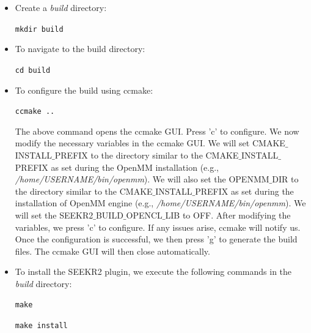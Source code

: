 \documentclass[9pt,training,pubversion]{livecoms}
\begin{document}
\begin{itemize}
\item Create a \textit{build} directory:

\begin{tcolorbox}[colback=black!8!white, colframe=black!50!black, fontlower=\tiny, left=2pt, right=2pt, top=2pt, bottom=2pt] 
\texttt{mkdir build} 
\end{tcolorbox}

\item To navigate to the build directory:

\begin{tcolorbox}[colback=black!8!white, colframe=black!50!black, fontlower=\tiny, left=2pt, right=2pt, top=2pt, bottom=2pt] 
\texttt{cd build} 
\end{tcolorbox}

\item To configure the build using ccmake:

\begin{tcolorbox}[colback=black!8!white, colframe=black!50!black, fontlower=\tiny, left=2pt, right=2pt, top=2pt, bottom=2pt] 
\texttt{ccmake ..} 
\end{tcolorbox}

\noindent The above command opens the ccmake GUI. Press 'c' to configure. We now modify the necessary variables in the ccmake GUI. We will set CMAKE$\_$INSTALL$\_$PREFIX to the directory similar to the CMAKE$\_$INSTALL$\_$PREFIX as set during the OpenMM installation (e.g., \textit{/home/USERNAME/bin/openmm}). We will also set the OPENMM$\_$DIR to the directory similar to the CMAKE$\_$INSTALL$\_$PREFIX as set during the installation of OpenMM engine (e.g., \textit{/home/USERNAME/bin/openmm}). We will set the SEEKR2$\_$BUILD$\_$OPENCL$\_$LIB to OFF. After modifying the variables, we press 'c' to configure. If any issues arise, ccmake will notify us. Once the configuration is successful, we then press 'g' to generate the build files. The ccmake GUI will then close automatically.

\item To install the SEEKR2 plugin, we execute the following commands in the \textit{build} directory:

\begin{tcolorbox}[colback=black!8!white, colframe=black!50!black, fontlower=\tiny, left=2pt, right=2pt, top=2pt, bottom=2pt] 
\texttt{make} 
\end{tcolorbox}

\begin{tcolorbox}[colback=black!8!white, colframe=black!50!black, fontlower=\tiny, left=2pt, right=2pt, top=2pt, bottom=2pt] 
\texttt{make install} 
\end{tcolorbox}


\end{itemize}
\end{document}
